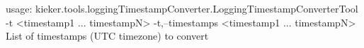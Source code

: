 usage: kieker.tools.loggingTimestampConverter.LoggingTimestampConverterTool -t <timestamp1 ... timestampN>
 -t,--timestamps <timestamp1 ... timestampN>   List of timestamps (UTC timezone) to convert
